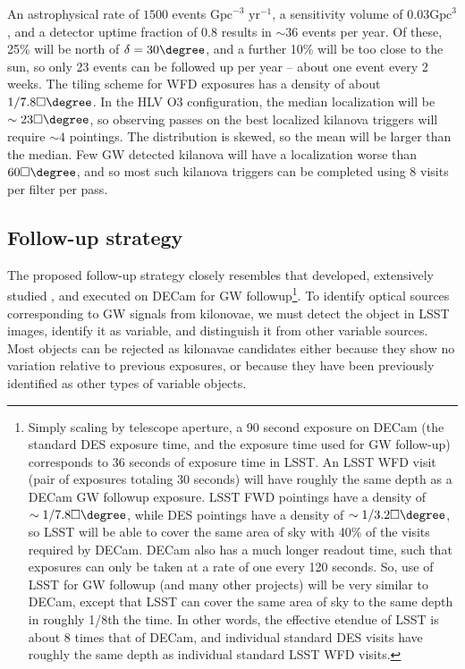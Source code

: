 An astrophysical rate of $1500$ events $\mbox{Gpc}^{-3}$ $\mbox{yr}^{-1}$, a sensitivity volume of $0.03 \mbox{Gpc}^3$ , and a detector uptime fraction of $0.8$ results in $\sim 36$ events per year. Of these, 25\% will be north of $\delta=30\degree$, and a further 10\% will be too close to the sun, so only 23 events can be followed up per year -- about one event every 2 weeks. The tiling scheme for WFD exposures has a density of about $1/7.8\square\degree$. In the HLV O3 configuration, the median localization will be $\sim 23 \square\degree$, so observing passes on the best localized kilanova triggers will require $\sim 4$ pointings. The distribution is skewed, so the mean will be larger than the median. Few GW detected kilanova will have a localization worse than $60 \square \degree$, and so most such kilanova triggers can be completed using 8 visits per filter per pass.


\subsection{Follow-up strategy}

The proposed follow-up strategy closely resembles that developed, extensively studied , and executed  on DECam for GW followup\footnote{Simply scaling by telescope aperture, a 90 second exposure on DECam (the standard DES exposure time, and the exposure time used for GW follow-up) corresponds to 36 seconds of exposure time in LSST. An LSST WFD visit (pair of exposures totaling 30 seconds) will have roughly the same depth as a DECam GW followup exposure. LSST FWD pointings have a density of $\sim 1/7.8\square\degree$, while DES pointings have a density of $\sim 1/3.2\square\degree$, so LSST will be able to cover the same area of sky with 40\% of the visits required by DECam.  DECam also has a much longer readout time, such that exposures can only be taken at a rate of one every 120 seconds. So, use of LSST for GW followup (and many other projects) will be very similar to DECam, except that LSST can cover the same area of sky to the same depth in roughly 1/8th the time. In other words, the effective etendue of LSST is about 8 times that of DECam, and individual standard DES visits have roughly the same depth as individual standard LSST WFD visits.}. To identify optical sources corresponding to GW signals from kilonovae, we must detect the object in LSST images, identify it as variable, and distinguish it from other variable sources. Most objects can be rejected as kilonavae candidates either because they show no variation relative to previous exposures, or because they have been previously identified as other types of variable objects.

